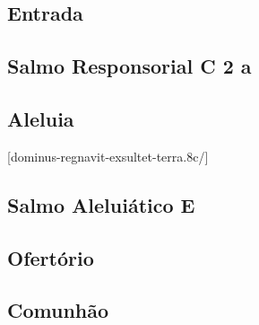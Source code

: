 
\subsection{Entrada}\label{subsection:tempus-per-annum/missa-1/introitus}

\subsection[Salmo Responsorial]{Salmo Responsorial \textmd{C 2 a}}\label{subsection:tempus-per-annum/missa-1/psalmus-responsorius}

\AllowPageFlush

\subsection{Aleluia}\label{subsection:tempus-per-annum/missa-1/alleluia}
[dominus-regnavit-exsultet-terra.8c/]

\subsection[Salmo Aleluiático]{Salmo Aleluiático \textmd{E \protect\GreStar}}\label{subsection:tempus-per-annum/missa-1/psalmus-alleluiaticus}

\subsection{Ofertório}\label{subsection:tempus-per-annum/missa-1/offertorium}

\AllowPageFlush

\subsection{Comunhão}\label{subsection:tempus-per-annum/missa-1/communio}
